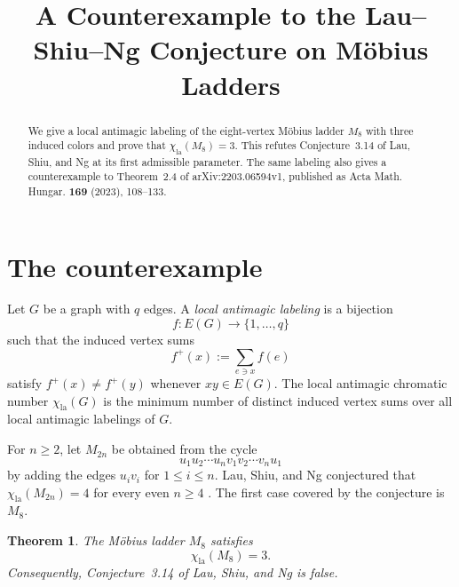 \documentclass[11pt]{amsart}
\title[The Lau--Shiu--Ng conjecture on M\"obius ladders]
{A Counterexample to the Lau--Shiu--Ng Conjecture on M\"obius Ladders}
\date{}
\newtheorem{theorem}{Theorem}
\theoremstyle{remark}
\newcommand{\la}{\mathrm{la}}
\begin{document}
\begin{abstract}
We give a local antimagic labeling of the eight-vertex M\"obius ladder
$M_8$ with three induced colors and prove that
$\chi_{\la}(M_8)=3$. This refutes Conjecture~3.14 of Lau, Shiu, and Ng
at its first admissible parameter. The same labeling also gives a
counterexample to Theorem~2.4 of arXiv:2203.06594v1, published as
Acta Math. Hungar. \textbf{169} (2023), 108--133.
\end{abstract}

\maketitle

\section{The counterexample}

Let $G$ be a graph with $q$ edges. A \emph{local antimagic labeling} is
a bijection
\[
f\colon E(G)\longrightarrow \{1,\dots,q\}
\]
such that the induced vertex sums
\[
f^+(x):=\sum_{e\ni x}f(e)
\]
satisfy $f^+(x)\ne f^+(y)$ whenever $xy\in E(G)$. The local antimagic
chromatic number $\chi_{\la}(G)$ is the minimum number of distinct
induced vertex sums over all local antimagic labelings of $G$.

For $n\ge2$, let $M_{2n}$ be obtained from the cycle
\[
u_1u_2\cdots u_nv_1v_2\cdots v_nu_1
\]
by adding the edges $u_iv_i$ for $1\le i\le n$. Lau, Shiu, and Ng
conjectured that $\chi_{\la}(M_{2n})=4$ for every even $n\ge4$
\cite[Conjecture~3.14]{LauShiuNg}. The first case covered by the
conjecture is $M_8$.

\begin{theorem}
The M\"obius ladder $M_8$ satisfies
\[
\chi_{\la}(M_8)=3.
\]
Consequently, Conjecture~3.14 of Lau, Shiu, and Ng is false.
\end{theorem}
\end{document}
